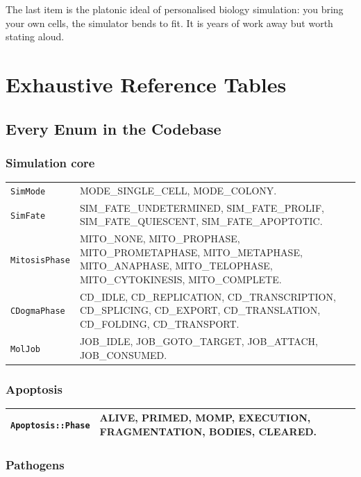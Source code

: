 \documentclass[11pt,letterpaper,twoside,openany]{book}
\newcommand{\code}[1]{\texttt{#1}}
\begin{document}
The last item is the platonic ideal of personalised biology
simulation: you bring your own cells, the simulator bends to fit.
It is years of work away but worth stating aloud.

\part{Exhaustive Reference Tables}

\chapter{Every Enum in the Codebase}
\label{ch:enums}

\section{Simulation core}

\begin{longtable}{p{4.2cm}p{10.0cm}}
\toprule
\code{SimMode} & MODE\_SINGLE\_CELL, MODE\_COLONY.\\
\code{SimFate} & SIM\_FATE\_UNDETERMINED, SIM\_FATE\_PROLIF, SIM\_FATE\_QUIESCENT, SIM\_FATE\_APOPTOTIC.\\
\code{MitosisPhase} & MITO\_NONE, MITO\_PROPHASE, MITO\_PROMETAPHASE, MITO\_METAPHASE, MITO\_ANAPHASE, MITO\_TELOPHASE, MITO\_CYTOKINESIS, MITO\_COMPLETE.\\
\code{CDogmaPhase} & CD\_IDLE, CD\_REPLICATION, CD\_TRANSCRIPTION, CD\_SPLICING, CD\_EXPORT, CD\_TRANSLATION, CD\_FOLDING, CD\_TRANSPORT.\\
\code{MolJob} & JOB\_IDLE, JOB\_GOTO\_TARGET, JOB\_ATTACH, JOB\_CONSUMED.\\
\bottomrule
\end{longtable}

\section{Apoptosis}

\begin{longtable}{p{4.2cm}p{10.0cm}}
\toprule
\code{Apoptosis::Phase} & ALIVE, PRIMED, MOMP, EXECUTION, FRAGMENTATION, BODIES, CLEARED.\\
\bottomrule
\end{longtable}

\section{Pathogens}
\end{document}
